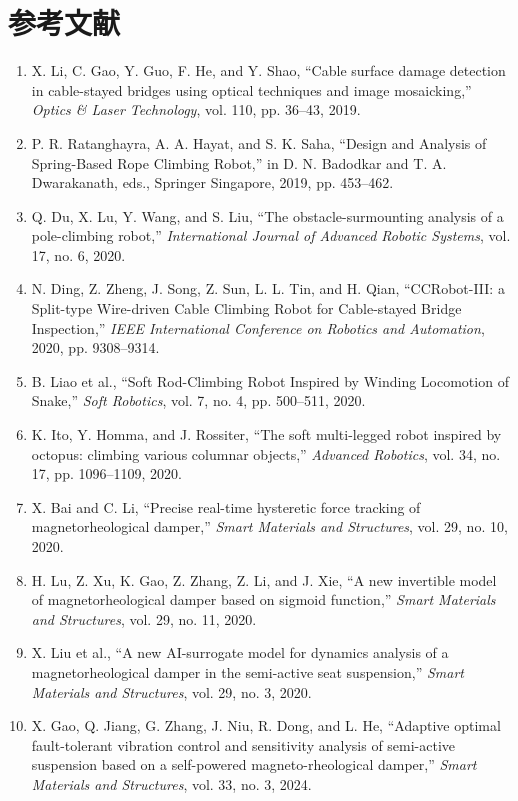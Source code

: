 \documentclass[12pt,a4paper]{ctexart}
\begin{document}
\section*{参考文献}
\begin{enumerate}
\item X. Li, C. Gao, Y. Guo, F. He, and Y. Shao, ``Cable surface damage detection in cable-stayed bridges using optical techniques and image mosaicking,'' \emph{Optics \& Laser Technology}, vol. 110, pp. 36--43, 2019.
\item P. R. Ratanghayra, A. A. Hayat, and S. K. Saha, ``Design and Analysis of Spring-Based Rope Climbing Robot,'' in D. N. Badodkar and T. A. Dwarakanath, eds., Springer Singapore, 2019, pp. 453--462.
\item Q. Du, X. Lu, Y. Wang, and S. Liu, ``The obstacle-surmounting analysis of a pole-climbing robot,'' \emph{International Journal of Advanced Robotic Systems}, vol. 17, no. 6, 2020.
\item N. Ding, Z. Zheng, J. Song, Z. Sun, L. L. Tin, and H. Qian, ``CCRobot-III: a Split-type Wire-driven Cable Climbing Robot for Cable-stayed Bridge Inspection,'' \emph{IEEE International Conference on Robotics and Automation}, 2020, pp. 9308--9314.
\item B. Liao et al., ``Soft Rod-Climbing Robot Inspired by Winding Locomotion of Snake,'' \emph{Soft Robotics}, vol. 7, no. 4, pp. 500--511, 2020.
\item K. Ito, Y. Homma, and J. Rossiter, ``The soft multi-legged robot inspired by octopus: climbing various columnar objects,'' \emph{Advanced Robotics}, vol. 34, no. 17, pp. 1096--1109, 2020.
\item X. Bai and C. Li, ``Precise real-time hysteretic force tracking of magnetorheological damper,'' \emph{Smart Materials and Structures}, vol. 29, no. 10, 2020.
\item H. Lu, Z. Xu, K. Gao, Z. Zhang, Z. Li, and J. Xie, ``A new invertible model of magnetorheological damper based on sigmoid function,'' \emph{Smart Materials and Structures}, vol. 29, no. 11, 2020.
\item X. Liu et al., ``A new AI-surrogate model for dynamics analysis of a magnetorheological damper in the semi-active seat suspension,'' \emph{Smart Materials and Structures}, vol. 29, no. 3, 2020.
\item X. Gao, Q. Jiang, G. Zhang, J. Niu, R. Dong, and L. He, ``Adaptive optimal fault-tolerant vibration control and sensitivity analysis of semi-active suspension based on a self-powered magneto-rheological damper,'' \emph{Smart Materials and Structures}, vol. 33, no. 3, 2024.

\end{enumerate}
\end{document}
